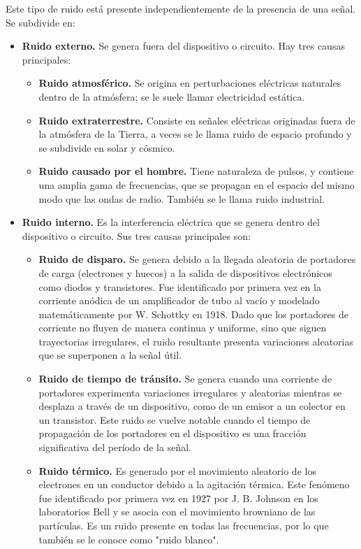 \begin{justify}
    Este tipo de ruido está presente independientemente de la presencia de una señal. Se subdivide en:

    \begin{itemize}
        \item \textbf{Ruido externo.} Se genera fuera del dispositivo o circuito. Hay tres causas principales:
        
        \begin{itemize}
            \item \textbf{Ruido atmosférico.} Se origina en perturbaciones eléctricas naturales dentro de la atmósfera;
            se le suele llamar electricidad estática.
            \item \textbf{Ruido extraterrestre.} Consiste en señales eléctricas originadas fuera de la atmósfera de la Tierra,
            a veces se le llama ruido de espacio profundo y se subdivide en solar y cósmico.
            \item \textbf{Ruido causado por el hombre.} Tiene naturaleza de pulsos, y contiene una amplia gama de frecuencias, que
            se propagan en el espacio del mismo modo que las ondas de radio. También se le llama ruido industrial.
        
        \end{itemize}
        \item \textbf{Ruido interno.} Es la interferencia eléctrica que se genera dentro del dispositivo o circuito. Sus tres
        causas principales son:
        
        \begin{itemize}
            \item \textbf{Ruido de disparo.} Se genera debido a la llegada aleatoria de portadores de carga (electrones y huecos) a la salida de dispositivos electrónicos
            como diodos y transistores. Fue identificado por primera vez en la corriente anódica de un amplificador de tubo al vacío y modelado matemáticamente por W. Schottky
            en 1918. Dado que los portadores de corriente no fluyen de manera continua y uniforme, sino que siguen trayectorias irregulares, el ruido resultante presenta
            variaciones aleatorias que se superponen a la señal útil.
            \item \textbf{Ruido de tiempo de tránsito.} Se genera cuando una corriente de portadores experimenta variaciones irregulares y aleatorias
            mientras se desplaza a través de un dispositivo, como de un emisor a un colector en un transistor. Este ruido se vuelve notable cuando el
            tiempo de propagación de los portadores en el dispositivo es una fracción significativa del período de la señal.
            \item \textbf{Ruido térmico.} Es generado por el movimiento aleatorio de los electrones en un conductor debido a la agitación térmica.
            Este fenómeno fue identificado por primera vez en 1927 por J. B. Johnson en los laboratorios Bell y se asocia con el movimiento browniano de las partículas.
            Es un ruido presente en todas las frecuencias, por lo que también se le conoce como "ruido blanco".
        \end{itemize}


\end{itemize}
\end{justify}
